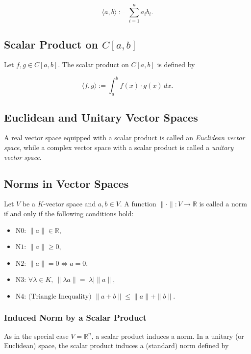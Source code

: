\[
\langle a, b \rangle := \sum_{i=1}^n a_i b_i.
\]

\subsection{Scalar Product on \( C[a, b] \)}

Let \( f, g \in C[a, b] \). The scalar product on \( C[a, b] \) is defined by

\[
\langle f, g \rangle := \int_a^b f(x) \cdot g(x) \, dx.
\]

\subsection{Euclidean and Unitary Vector Spaces}

A real vector space equipped with a scalar product is called an \textit{Euclidean vector space}, while a complex vector space with a scalar product is called a \textit{unitary vector space}.

\subsection{Norms in Vector Spaces}

Let \( V \) be a \( K \)-vector space and \( a, b \in V \). A function \( \| \cdot \| : V \to \mathbb{R} \) is called a norm if and only if the following conditions hold:

\begin{itemize}
    \item \( \text{N0: } \|a\| \in \mathbb{R} \),
    \item \( \text{N1: } \|a\| \geq 0 \),
    \item \( \text{N2: } \|a\| = 0 \iff a = 0 \),
    \item \( \text{N3: } \forall \lambda \in K, \ \| \lambda a \| = |\lambda| \| a \| \),
    \item \( \text{N4: (Triangle Inequality) } \| a + b \| \leq \| a \| + \| b \| \).
\end{itemize}

\subsubsection{Induced Norm by a Scalar Product}

As in the special case \( V = \mathbb{R}^n \), a scalar product induces a norm.
In a unitary (or Euclidean) space, the scalar product induces a (standard) norm defined by

